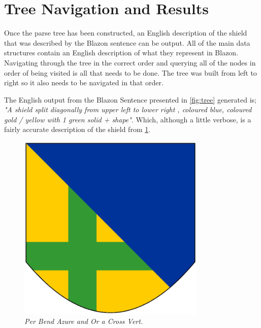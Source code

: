 \section{Tree Navigation and Results}

Once the parse tree has been constructed, an English description of the shield that was described by the Blazon sentence can be output. 
All of the main data structures contain an English description of what they represent in Blazon.  Navigating through the tree in the correct order and querying  all of the nodes in order of being visited is all that needs to be done.  The tree was built from left to right so it also needs to be navigated in that order.  


The English output from the Blazon Sentence presented in \ref{fig:tree} generated is; \emph{"A shield split diagonally from upper left to lower right , coloured blue, coloured gold / yellow with 1 green solid + shape"}.  Which, although a little verbose, is a fairly accurate description of the shield from \ref{fig:result}.  



\begin{figure}[H]
  \centering
    \includegraphics[width=0.8\textwidth]{parsing/images/demo.eps}
  \caption{\emph{Per Bend Azure and Or a Cross Vert.}}
  \label{fig:result}
  
\end{figure}



